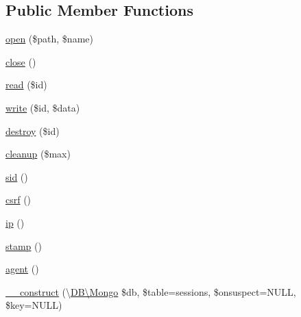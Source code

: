 \subsection*{Public Member Functions}
\begin{DoxyCompactItemize}
\item 
\hyperlink{class_d_b_1_1_mongo_1_1_session_a037c59224bcb347b69ca61df88ef7230}{open} (\$path, \$name)
\item 
\hyperlink{class_d_b_1_1_mongo_1_1_session_aa69c8bf1f1dcf4e72552efff1fe3e87e}{close} ()
\item 
\hyperlink{class_d_b_1_1_mongo_1_1_session_afa59bebedda70c37b94c2efc35da83f3}{read} (\$id)
\item 
\hyperlink{class_d_b_1_1_mongo_1_1_session_a5f277b5f0e4e2154cddc9a3a0d2bf57d}{write} (\$id, \$data)
\item 
\hyperlink{class_d_b_1_1_mongo_1_1_session_a726fa8a4b4b187b9ca32ba427aac8137}{destroy} (\$id)
\item 
\hyperlink{class_d_b_1_1_mongo_1_1_session_a60b027eb0df6d42b8fe2ec8c93cfbbae}{cleanup} (\$max)
\item 
\hyperlink{class_d_b_1_1_mongo_1_1_session_a30b416c35150ab6bdde364f527f612bd}{sid} ()
\item 
\hyperlink{class_d_b_1_1_mongo_1_1_session_a048d24aa22a28f92f1f3a7e3d323f45e}{csrf} ()
\item 
\hyperlink{class_d_b_1_1_mongo_1_1_session_a197bae3714812901860bd006b00f91de}{ip} ()
\item 
\hyperlink{class_d_b_1_1_mongo_1_1_session_ab0b8b94527259f4aacdf1fd45411abfe}{stamp} ()
\item 
\hyperlink{class_d_b_1_1_mongo_1_1_session_a77f6a261d70e66c7b7273774832482dc}{agent} ()
\item 
\hyperlink{class_d_b_1_1_mongo_1_1_session_ada564f6a7ed0e500e4dcb57e02e03c83}{\+\_\+\+\_\+construct} (\textbackslash{}\hyperlink{class_d_b_1_1_mongo}{D\+B\textbackslash{}\+Mongo} \$db, \$table=\textquotesingle{}sessions\textquotesingle{}, \$onsuspect=N\+U\+LL, \$key=N\+U\+LL)
\end{DoxyCompactItemize}
